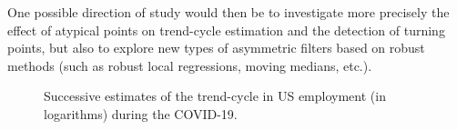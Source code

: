 \documentclass[
]{article}
\newcommand\1{\mathds{1}}
\begin{document}
One possible direction of study would then be to investigate more
precisely the effect of atypical points on trend-cycle estimation and
the detection of turning points, but also to explore new types of
asymmetric filters based on robust methods (such as robust local
regressions, moving medians, etc.).

\begin{figure}[H]

\caption{\label{fig-ce16ovcovid}Successive estimates of the trend-cycle
in US employment (in logarithms) during the COVID-19.}


\end{figure}%
\end{document}
